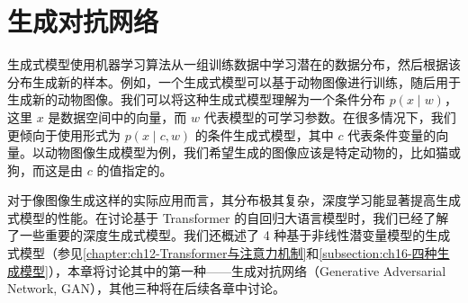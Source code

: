 \documentclass[../main.tex]{subfiles}
\begin{document}
\chapter{生成对抗网络}\label{chapter:ch17-生成对抗网络}

生成式模型使用机器学习算法从一组训练数据中学习潜在的数据分布，然后根据该分布生成新的样本。例如，一个生成式模型可以基于动物图像进行训练，随后用于生成新的动物图像。我们可以将这种生成式模型理解为一个条件分布 $p(x\mid w)$，这里 $x$ 是数据空间中的向量，而 $w$ 代表模型的可学习参数。在很多情况下，我们更倾向于使用形式为 $p(x\mid c,w)$ 的条件生成式模型，其中 $c$ 代表条件变量的向量。以动物图像生成模型为例，我们希望生成的图像应该是特定动物的，比如猫或狗，而这是由 $c$ 的值指定的。

对于像图像生成这样的实际应用而言，其分布极其复杂，深度学习能显著提高生成式模型的性能。在讨论基于 Transformer 的自回归大语言模型时，我们已经了解了一些重要的深度生成式模型。我们还概述了 4 种基于非线性潜变量模型的生成式模型（参见\cref{chapter:ch12-Transformer与注意力机制}和\cref{subsection:ch16-四种生成模型}），本章将讨论其中的第一种——生成对抗网络（Generative Adversarial Network, GAN），其他三种将在后续各章中讨论。






\end{document}
